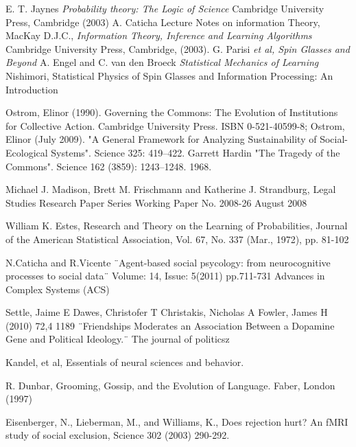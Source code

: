 \documentclass[12pt]{article}
\begin{document}
\newpage
\begin{thebibliography}{30}

E. T. Jaynes {\it Probability theory: The Logic of
    Science} Cambridge University Press, Cambridge (2003)
 A. Caticha Lecture Notes on information Theory,
 MacKay D.J.C., \textit{Information Theory, Inference
    and Learning Algorithms}
Cambridge University Press, Cambridge, (2003).
 G. Parisi {\it et al, Spin Glasses and Beyond}
 A. Engel and C. van den Broeck {\it Statistical
    Mechanics of Learning}
 Nishimori, Statistical Physics of Spin Glasses and Information Processing: An Introduction

Ostrom, Elinor (1990). Governing the Commons: The Evolution of Institutions for Collective Action. Cambridge University Press. ISBN 0-521-40599-8; Ostrom, Elinor (July 2009). "A General Framework for Analyzing Sustainability of Social-Ecological Systems". Science 325: 419–422.
Garrett Hardin
"The Tragedy of the Commons". Science 162 (3859): 1243–1248. 1968.

Michael J. Madison, Brett M. Frischmann
and Katherine J. Strandburg, 
Legal Studies Research Paper Series
Working Paper No. 2008-26
August 2008

William K. Estes, Research and Theory on the
Learning of Probabilities,
Journal of the American Statistical Association, Vol. 67, No. 337
(Mar., 1972), pp. 81-102

N.Caticha and R.Vicente ¨Agent-based social psycology: from neurocognitive processes to social data¨ Volume: 14, Issue: 5(2011) pp.711-731 Advances in Complex Systems (ACS)

Settle, Jaime E Dawes, Christofer T Christakis, Nicholas A Fowler, James H (2010) 72,4 1189 ¨Friendships Moderates an Association Between a Dopamine Gene and Political Ideology.¨ The journal of politicsz

 Kandel, et al, Essentials of neural sciences and behavior.


 R. Dunbar,  Grooming, Gossip, and the
Evolution of Language. Faber, London (1997)



 Eisenberger, N., Lieberman, M., and Williams, K., Does rejection hurt? An fMRI
study of social exclusion, Science 302 (2003) 290-292.


\end{thebibliography}
\end{document}
